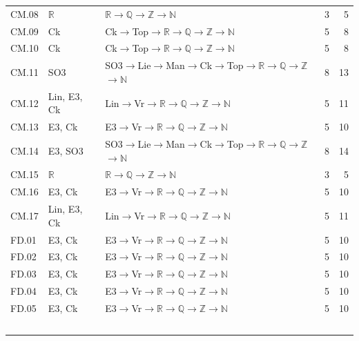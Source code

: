 {\begin{longtable}{l p{4.6cm} p{7.4cm} r r}
CM.08 & $\mathbb R$ & $\mathbb R$$\to$$\mathbb Q$$\to$$\mathbb Z$$\to$$\mathbb N$ & 3 & 5 \\
CM.09 & \textsf{Ck} & \textsf{Ck}$\to$\textsf{Top}$\to$$\mathbb R$$\to$$\mathbb Q$$\to$$\mathbb Z$$\to$$\mathbb N$ & 5 & 8 \\
CM.10 & \textsf{Ck} & \textsf{Ck}$\to$\textsf{Top}$\to$$\mathbb R$$\to$$\mathbb Q$$\to$$\mathbb Z$$\to$$\mathbb N$ & 5 & 8 \\
CM.11 & \textsf{SO3} & \textsf{SO3}$\to$\textsf{Lie}$\to$\textsf{Man}$\to$\textsf{Ck}$\to$\textsf{Top}$\to$$\mathbb R$$\to$$\mathbb Q$$\to$$\mathbb Z$$\to$$\mathbb N$ & 8 & 13 \\
CM.12 & \textsf{Lin}, \textsf{E3}, \textsf{Ck} & \textsf{Lin}$\to$\textsf{Vr}$\to$$\mathbb R$$\to$$\mathbb Q$$\to$$\mathbb Z$$\to$$\mathbb N$ & 5 & 11 \\
CM.13 & \textsf{E3}, \textsf{Ck} & \textsf{E3}$\to$\textsf{Vr}$\to$$\mathbb R$$\to$$\mathbb Q$$\to$$\mathbb Z$$\to$$\mathbb N$ & 5 & 10 \\
CM.14 & \textsf{E3}, \textsf{SO3} & \textsf{SO3}$\to$\textsf{Lie}$\to$\textsf{Man}$\to$\textsf{Ck}$\to$\textsf{Top}$\to$$\mathbb R$$\to$$\mathbb Q$$\to$$\mathbb Z$$\to$$\mathbb N$ & 8 & 14 \\
CM.15 & $\mathbb R$ & $\mathbb R$$\to$$\mathbb Q$$\to$$\mathbb Z$$\to$$\mathbb N$ & 3 & 5 \\
CM.16 & \textsf{E3}, \textsf{Ck} & \textsf{E3}$\to$\textsf{Vr}$\to$$\mathbb R$$\to$$\mathbb Q$$\to$$\mathbb Z$$\to$$\mathbb N$ & 5 & 10 \\
CM.17 & \textsf{Lin}, \textsf{E3}, \textsf{Ck} & \textsf{Lin}$\to$\textsf{Vr}$\to$$\mathbb R$$\to$$\mathbb Q$$\to$$\mathbb Z$$\to$$\mathbb N$ & 5 & 11 \\
FD.01 & \textsf{E3}, \textsf{Ck} & \textsf{E3}$\to$\textsf{Vr}$\to$$\mathbb R$$\to$$\mathbb Q$$\to$$\mathbb Z$$\to$$\mathbb N$ & 5 & 10 \\
FD.02 & \textsf{E3}, \textsf{Ck} & \textsf{E3}$\to$\textsf{Vr}$\to$$\mathbb R$$\to$$\mathbb Q$$\to$$\mathbb Z$$\to$$\mathbb N$ & 5 & 10 \\
FD.03 & \textsf{E3}, \textsf{Ck} & \textsf{E3}$\to$\textsf{Vr}$\to$$\mathbb R$$\to$$\mathbb Q$$\to$$\mathbb Z$$\to$$\mathbb N$ & 5 & 10 \\
FD.04 & \textsf{E3}, \textsf{Ck} & \textsf{E3}$\to$\textsf{Vr}$\to$$\mathbb R$$\to$$\mathbb Q$$\to$$\mathbb Z$$\to$$\mathbb N$ & 5 & 10 \\
FD.05 & \textsf{E3}, \textsf{Ck} & \textsf{E3}$\to$\textsf{Vr}$\to$$\mathbb R$$\to$$\mathbb Q$$\to$$\mathbb Z$$\to$$\mathbb N$ & 5 & 10 \\
$$
\end{longtable}}
